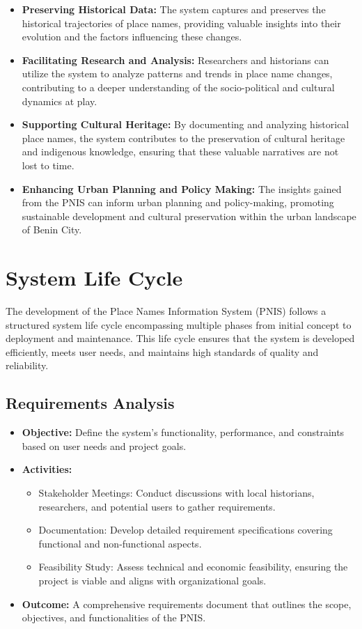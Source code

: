 \begin{itemize}
    \item \textbf{Preserving Historical Data:} The system captures and preserves the historical trajectories of place names, providing valuable insights into their evolution and the factors influencing these changes.
    \item \textbf{Facilitating Research and Analysis:} Researchers and historians can utilize the system to analyze patterns and trends in place name changes, contributing to a deeper understanding of the socio-political and cultural dynamics at play.
    \item \textbf{Supporting Cultural Heritage:} By documenting and analyzing historical place names, the system contributes to the preservation of cultural heritage and indigenous knowledge, ensuring that these valuable narratives are not lost to time.
    \item \textbf{Enhancing Urban Planning and Policy Making:} The insights gained from the PNIS can inform urban planning and policy-making, promoting sustainable development and cultural preservation within the urban landscape of Benin City.
\end{itemize}

\section{System Life Cycle}
The development of the Place Names Information System (PNIS) follows a structured system life cycle encompassing multiple phases from initial concept to deployment and maintenance. This life cycle ensures that the system is developed efficiently, meets user needs, and maintains high standards of quality and reliability.

\subsection{Requirements Analysis}
\begin{itemize}
    \item \textbf{Objective:} Define the system's functionality, performance, and constraints based on user needs and project goals.
    \item \textbf{Activities:}
        \begin{itemize}
            \item Stakeholder Meetings: Conduct discussions with local historians, researchers, and potential users to gather requirements.
            \item Documentation: Develop detailed requirement specifications covering functional and non-functional aspects.
            \item Feasibility Study: Assess technical and economic feasibility, ensuring the project is viable and aligns with organizational goals.
        \end{itemize}
    \item \textbf{Outcome:} A comprehensive requirements document that outlines the scope, objectives, and functionalities of the PNIS.
\end{itemize}

